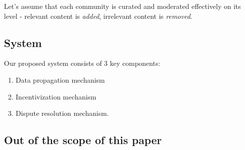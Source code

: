 \documentclass[10pt,a4paper]{article}
\begin{document}
\newline

Let’s assume that each community is curated and moderated effectively on its level - relevant content is {\it added}, irrelevant content is {\it removed}.

\subsection{System}

Our proposed system consists of 3 key components:

\begin{enumerate}
    \item Data propagation mechanism
    \item Incentivization mechanism
    \item Dispute resolution mechanism.
\end{enumerate}

\subsection{Out of the scope of this paper}
\end{document}
